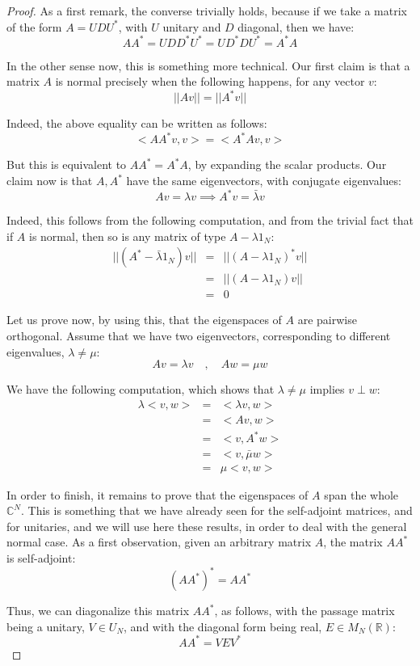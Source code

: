 \documentclass[12pt]{amsbook}
\begin{document}
\begin{proof}
As a first remark, the converse trivially holds, because if we take a matrix of the form $A=UDU^*$, with $U$ unitary and $D$ diagonal, then we have:
$$AA^*
=UDD^*U^*
=UD^*DU^*
=A^*A$$

In the other sense now, this is something more technical. Our first claim is that a matrix $A$ is normal precisely when the following happens, for any vector $v$:
$$||Av||=||A^*v||$$

Indeed, the above equality can be written as follows:
$$<AA^*v,v>=<A^*Av,v>$$

But this is equivalent to $AA^*=A^*A$, by expanding the scalar products. Our claim now is that $A,A^*$ have the same eigenvectors, with conjugate eigenvalues:
$$Av=\lambda v\implies A^*v=\bar{\lambda}v$$

Indeed, this follows from the following computation, and from the trivial fact that if $A$ is normal, then so is any matrix of type $A-\lambda 1_N$:
\begin{eqnarray*}
||(A^*-\bar{\lambda}1_N)v||
&=&||(A-\lambda 1_N)^*v||\\
&=&||(A-\lambda 1_N)v||\\
&=&0
\end{eqnarray*}

Let us prove now, by using this, that the eigenspaces of $A$ are pairwise orthogonal. Assume that we have two eigenvectors, corresponding to different eigenvalues, $\lambda\neq\mu$:
$$Av=\lambda v\quad,\quad 
Aw=\mu w$$

We have the following computation, which shows that $\lambda\neq\mu$ implies $v\perp w$:
\begin{eqnarray*}
\lambda<v,w>
&=&<\lambda v,w>\\
&=&<Av,w>\\
&=&<v,A^*w>\\
&=&<v,\bar{\mu}w>\\
&=&\mu<v,w>
\end{eqnarray*}

In order to finish, it remains to prove that the eigenspaces of $A$ span the whole $\mathbb C^N$. This is something that we have already seen for the self-adjoint matrices, and for unitaries, and we will use here these results, in order to deal with the general normal case. As a first observation, given an arbitrary matrix $A$, the matrix $AA^*$ is self-adjoint:
$$(AA^*)^*=AA^*$$

Thus, we can diagonalize this matrix $AA^*$, as follows, with the passage matrix being a unitary, $V\in U_N$, and with the diagonal form being real, $E\in M_N(\mathbb R)$:
$$AA^*=VEV^*$$


\end{proof}
\end{document}
